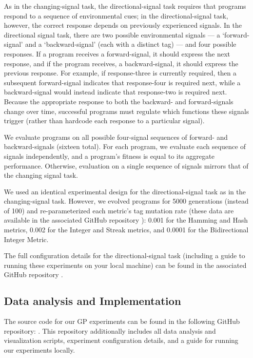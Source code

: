 As in the changing-signal task, the directional-signal task requires that programs respond to a sequence of environmental cues; in the directional-signal task, however, the correct response depends on previously experienced signals.
In the directional signal task, there are two possible environmental signals --- a `forward-signal' and a `backward-signal' (each with a distinct tag) ---  and four possible responses.
If a program receives a forward-signal, it should express the next response, and if the program receives, a backward-signal, it should express the previous response.
For example, if response-three is currently required, then a subsequent forward-signal indicates that response-four is required next, while a backward-signal would instead indicate that response-two is required next.
Because the appropriate response to both the backward- and forward-signals change over time, successful programs must regulate which functions these signals trigger (rather than hardcode each response to a particular signal).

We evaluate programs on all possible four-signal sequences of forward- and backward-signals (sixteen total).
For each program, we evaluate each sequence of signals independently, and a program's fitness is equal to its aggregate performance.
Otherwise, evaluation on a single sequence of signals mirrors that of the changing signal task.

We used an identical experimental design for the directional-signal task as in the changing-signal task. 
However, we evolved programs for 5000 generations (instead of 100) and re-parameterized each metric's tag mutation rate (these data are available in the associated GitHub repository ): 
0.001 for the Hamming and Hash metrics, 0.002 for the Integer and Streak metrics, and 0.0001 for the Bidirectional Integer Metric. 

The full configuration details for the directional-signal task (including a guide to running these experiments on your local machine) can be found in the associated GitHub repository .

\subsection{Data analysis and Implementation}

The source code for our GP experiments can be found in the following GitHub repository: . This repository additionally includes all data analysis and visualization scripts, experiment configuration details, and a guide for running our experiments locally.


